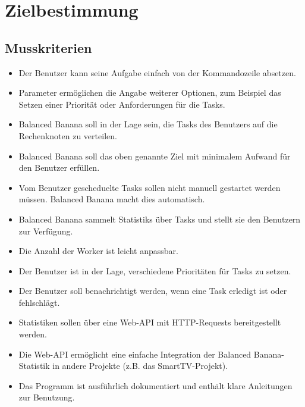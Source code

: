 \documentclass[a4paper,12pt]{article}
\begin{document}
\clearpage
\section{Zielbestimmung}
\subsection{Musskriterien}
\begin{itemize}[nosep]
	
	\item Der Benutzer kann seine Aufgabe einfach von der Kommandozeile absetzen.
	
	\item Parameter ermöglichen die Angabe weiterer Optionen, zum Beispiel das Setzen einer Priorität oder Anforderungen für die Tasks. 
		
	\item Balanced Banana soll in der Lage sein, die Tasks des Benutzers auf die \gls{Rechenknoten} zu verteilen.
	
	\item Balanced Banana soll das oben genannte Ziel mit minimalem Aufwand für den Benutzer erfüllen.
	
	\item Vom Benutzer gescheduelte \glspl{Task} sollen nicht manuell gestartet werden müssen. Balanced Banana macht dies automatisch.
	
	\item Balanced Banana sammelt \glspl{Statistik} über \glspl{Task} und stellt sie den Benutzern zur Verfügung.
	
	\item Die Anzahl der Worker ist leicht anpassbar.
	
	\item Der Benutzer ist in der Lage, verschiedene Prioritäten für Tasks zu setzen.
	
	\item Der Benutzer soll benachrichtigt werden, wenn eine Task erledigt ist oder fehlschlägt.
	
	\item Statistiken sollen über eine \gls{Web-API} mit HTTP-Requests bereitgestellt werden.
	
	\item Die \gls{Web-API} ermöglicht eine einfache Integration der Balanced Banana-Statistik in andere Projekte (z.B. das SmartTV-Projekt).
	
	\item Das Programm ist ausführlich dokumentiert und enthält klare Anleitungen zur Benutzung.

\end{itemize}
\end{document}
